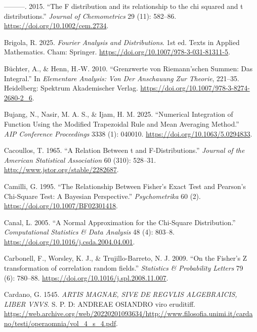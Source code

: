 \documentclass[
]{article}
\newlength{\cslhangindent}
\newlength{\cslentryspacingunit} %
\newenvironment{CSLReferences}[2] %
 {%
  \setlength{\parindent}{0pt}
  \ifodd #1
  \let\oldpar\par
  \def\par{\hangindent=\cslhangindent\oldpar}
  \fi
  \setlength{\parskip}{#2\cslentryspacingunit}
 }%
 {}
\begin{document}
\begin{CSLReferences}{1}{0}
\leavevmode{}%
---------. 2015. {``{The F distribution and its relationship to the chi
squared and t distributions}.''} \emph{Journal of Chemometrics} 29 (11):
582--86. \url{https://doi.org/10.1002/cem.2734}.

\leavevmode{}%
Brigola, R. 2025. \emph{Fourier Analysis and Distributions}. 1st ed.
Texts in Applied Mathematics. Cham: Springer.
\url{https://doi.org/10.1007/978-3-031-81311-5}.

\leavevmode{}%
Büchter, A., \& Henn, H.-W. 2010. {``Grenzwerte von Riemann'schen
Summen: Das Integral.''} In \emph{Elementare Analysis: Von Der
Anschauung Zur Theorie}, 221--35. Heidelberg: Spektrum Akademischer
Verlag. \url{https://doi.org/10.1007/978-3-8274-2680-2_6}.

\leavevmode{}%
Bujang, N., Nasir, M. A. S., \& Ijam, H. M. 2025. {``Numerical
Integration of Function Using the Modified Trapezoidal Rule and Mean
Averaging Method.''} \emph{AIP Conference Proceedings} 3338 (1): 040010.
\url{https://doi.org/10.1063/5.0294833}.

\leavevmode{}%
Cacoullos, T. 1965. {``{A Relation Between t and F-Distributions}.''}
\emph{Journal of the American Statistical Association} 60 (310):
528--31. \url{http://www.jstor.org/stable/2282687}.

\leavevmode{}%
Camilli, G. 1995. {``The Relationship Between Fisher's Exact Test and
Pearson's Chi-Square Test: A Bayesian Perspective.''}
\emph{Psychometrika} 60 (2). \url{https://doi.org/10.1007/BF02301418}.

\leavevmode{}%
Canal, L. 2005. {``A Normal Approximation for the Chi-Square
Distribution.''} \emph{Computational Statistics \& Data Analysis} 48
(4): 803--8. \url{https://doi.org/10.1016/j.csda.2004.04.001}.

\leavevmode{}%
Carbonell, F., Worsley, K. J., \& Trujillo-Barreto, N. J. 2009. {``{On
the Fisher's Z transformation of correlation random fields}.''}
\emph{Statistics \& Probability Letters} 79 (6): 780--88.
\url{https://doi.org/10.1016/j.spl.2008.11.007}.

\leavevmode{}%
Cardano, G. 1545. \emph{{ARTIS MAGNAE, SIVE DE REGVLIS ALGEBRAICIS,
LIBER VNVS}}. S. P. D: ANDREAE OSIANDRO viro eruditiff.
\url{https://web.archive.org/web/20220201093634/http://www.filosofia.unimi.it/cardano/testi/operaomnia/vol_4_s_4.pdf}.


\end{CSLReferences}
\end{document}
